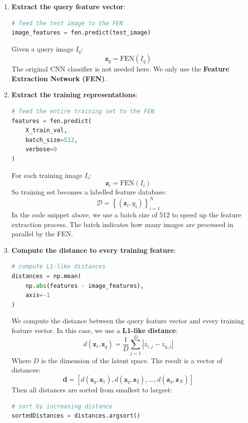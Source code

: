 \begin{enumerate}
    \item \textbf{Extract the query feature vector}:
    \begin{lstlisting}[language=Python]
# feed the test image to the FEN
image_features = fen.predict(test_image)
\end{lstlisting}
    Given a query image $I_q$:
    \begin{equation*}
        \mathbf{z}_q = \text{FEN}(I_q)
    \end{equation*}
    The original CNN classifier is not needed here. We only use the \textbf{Feature Extraction Network (FEN)}.
    
    
    \item \textbf{Extract the training representations}:
    \begin{lstlisting}[language=Python]
# feed the entire training set to the FEN
features = fen.predict(
    X_train_val,
    batch_size=512,
    verbose=0
)
\end{lstlisting}
    For each training image $I_i$:
    \begin{equation*}
        \mathbf{z}_i = \text{FEN}(I_i)
    \end{equation*}
    So training set becomes a labelled feature database:
    \begin{equation*}
        \mathcal{D} = \left\{
            \left(
                \mathbf{z}_i , y_i
            \right)
        \right\}_{i=1}^{N}
    \end{equation*}
    In the code snippet above, we use a batch size of 512 to speed up the feature extraction process. The batch indicates how many images are processed in parallel by the FEN.


    \item \textbf{Compute the distance to every training feature}:
    \begin{lstlisting}[language=Python]
# compute L1-like distances
distances = np.mean(
    np.abs(features - image_features),
    axis=-1
)
\end{lstlisting}
    We compute the distance between the query feature vector and every training feature vector. In this case, we use a \textbf{L1-like distance}:
    \begin{equation*}
        d(\mathbf{z}_i, \mathbf{z}_q) = \frac{1}{D} \sum_{j=1}^{D} \left| z_{i,j} - z_{q,j} \right|
    \end{equation*}
    Where $D$ is the dimension of the latent space. The result is a vector of distances:
    \begin{equation*}
        \mathbf{d} = [d(\mathbf{z}_q, \mathbf{z}_1), d(\mathbf{z}_q, \mathbf{z}_2), ..., d(\mathbf{z}_q, \mathbf{z}_N)]
    \end{equation*}
    Then all distances are sorted from smallest to largest:
    \begin{lstlisting}[language=Python]
# sort by increasing distance
sortedDistances = distances.argsort()
\end{lstlisting}



\end{enumerate}
